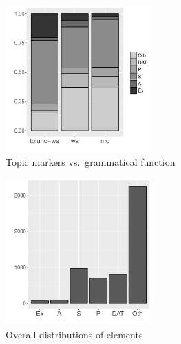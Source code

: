\begin{figure}
	\begin{center}
	\includegraphics[width=0.5\textwidth]{figure/ASPTopPar.pdf}
	\caption{Topic markers vs.~grammatical function}
	\label{Par:ASPTopParF}
	\end{center}
\end{figure}
\begin{figure}
	\begin{center}
	\includegraphics[width=0.5\textwidth]{figure/ASPall.pdf}
	\caption{Overall distributions of elements}
	\label{Par:ASPallF}
	\end{center}
\end{figure}


